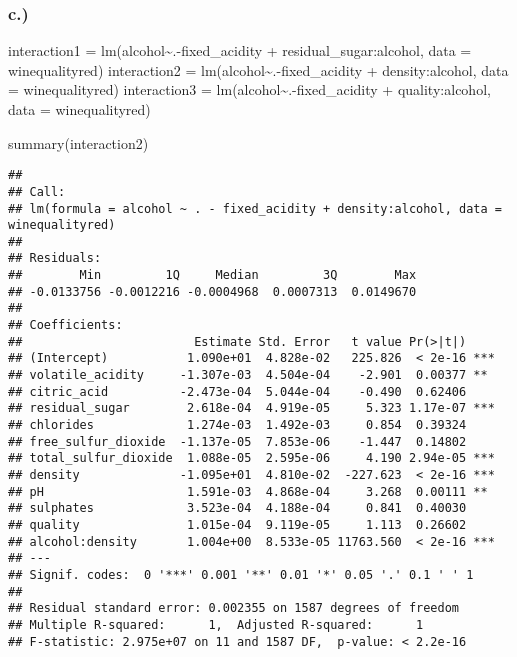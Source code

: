 \documentclass[
]{article}
\newenvironment{Shaded}{\begin{snugshade}}{\end{snugshade}}
\newcommand{\AttributeTok}[1]{\textcolor[rgb]{0.77,0.63,0.00}{#1}}
\newcommand{\FunctionTok}[1]{\textcolor[rgb]{0.00,0.00,0.00}{#1}}
\newcommand{\NormalTok}[1]{#1}
\newcommand{\OtherTok}[1]{\textcolor[rgb]{0.56,0.35,0.01}{#1}}
\newcommand{\SpecialCharTok}[1]{\textcolor[rgb]{0.00,0.00,0.00}{#1}}
\begin{document}
\hypertarget{c.}{%
\subsubsection{c.)}\label{c.}}

\begin{Shaded}
\begin{Highlighting}[]
\NormalTok{interaction1 }\OtherTok{=} \FunctionTok{lm}\NormalTok{(alcohol}\SpecialCharTok{\textasciitilde{}}\NormalTok{.}\SpecialCharTok{{-}}\NormalTok{fixed\_acidity }\SpecialCharTok{+}\NormalTok{ residual\_sugar}\SpecialCharTok{:}\NormalTok{alcohol, }\AttributeTok{data =}\NormalTok{ winequalityred)}
\NormalTok{interaction2 }\OtherTok{=} \FunctionTok{lm}\NormalTok{(alcohol}\SpecialCharTok{\textasciitilde{}}\NormalTok{.}\SpecialCharTok{{-}}\NormalTok{fixed\_acidity }\SpecialCharTok{+}\NormalTok{ density}\SpecialCharTok{:}\NormalTok{alcohol, }\AttributeTok{data =}\NormalTok{ winequalityred)}
\NormalTok{interaction3 }\OtherTok{=} \FunctionTok{lm}\NormalTok{(alcohol}\SpecialCharTok{\textasciitilde{}}\NormalTok{.}\SpecialCharTok{{-}}\NormalTok{fixed\_acidity }\SpecialCharTok{+}\NormalTok{ quality}\SpecialCharTok{:}\NormalTok{alcohol, }\AttributeTok{data =}\NormalTok{ winequalityred)}

\FunctionTok{summary}\NormalTok{(interaction2)}
\end{Highlighting}
\end{Shaded}

\begin{verbatim}
## 
## Call:
## lm(formula = alcohol ~ . - fixed_acidity + density:alcohol, data = winequalityred)
## 
## Residuals:
##        Min         1Q     Median         3Q        Max 
## -0.0133756 -0.0012216 -0.0004968  0.0007313  0.0149670 
## 
## Coefficients:
##                        Estimate Std. Error   t value Pr(>|t|)    
## (Intercept)           1.090e+01  4.828e-02   225.826  < 2e-16 ***
## volatile_acidity     -1.307e-03  4.504e-04    -2.901  0.00377 ** 
## citric_acid          -2.473e-04  5.044e-04    -0.490  0.62406    
## residual_sugar        2.618e-04  4.919e-05     5.323 1.17e-07 ***
## chlorides             1.274e-03  1.492e-03     0.854  0.39324    
## free_sulfur_dioxide  -1.137e-05  7.853e-06    -1.447  0.14802    
## total_sulfur_dioxide  1.088e-05  2.595e-06     4.190 2.94e-05 ***
## density              -1.095e+01  4.810e-02  -227.623  < 2e-16 ***
## pH                    1.591e-03  4.868e-04     3.268  0.00111 ** 
## sulphates             3.523e-04  4.188e-04     0.841  0.40030    
## quality               1.015e-04  9.119e-05     1.113  0.26602    
## alcohol:density       1.004e+00  8.533e-05 11763.560  < 2e-16 ***
## ---
## Signif. codes:  0 '***' 0.001 '**' 0.01 '*' 0.05 '.' 0.1 ' ' 1
## 
## Residual standard error: 0.002355 on 1587 degrees of freedom
## Multiple R-squared:      1,  Adjusted R-squared:      1 
## F-statistic: 2.975e+07 on 11 and 1587 DF,  p-value: < 2.2e-16
\end{verbatim}
\end{document}
